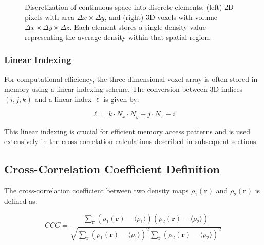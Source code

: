 \documentclass[12pt,a4paper]{article}
\begin{document}
\begin{figure}[h]
\caption{Discretization of continuous space into discrete 
elements: (left) 2D pixels with area $\Delta x \times \Delta y$, 
and (right) 3D voxels with volume $\Delta x \times \Delta y \times \Delta z$. 
Each element stores a single density value representing the average 
density within that spatial region.}
\label{fig:pixel_voxel}
\end{figure}

\subsubsection{Linear Indexing}

For computational efficiency, the three-dimensional voxel array 
is often stored in memory using a linear indexing scheme. The 
conversion between 3D indices $(i,j,k)$ and a linear index $\ell$ 
is given by:

\begin{equation}
\ell = k \cdot N_x \cdot N_y + j \cdot N_x + i
\end{equation}

This linear indexing is crucial for efficient memory access patterns 
and is used extensively in the cross-correlation calculations described 
in subsequent sections.
\subsection{Cross-Correlation Coefficient Definition}

The cross-correlation coefficient between two density maps 
$\rho_1(\mathbf{r})$ and $\rho_2(\mathbf{r})$ is defined as:

\begin{equation}
CCC = \frac{\sum_{\mathbf{r}} (\rho_1(\mathbf{r}) - \langle\rho_1\rangle)(\rho_2(\mathbf{r}) - \langle\rho_2\rangle)}{\sqrt{\sum_{\mathbf{r}} (\rho_1(\mathbf{r}) - \langle\rho_1\rangle)^2 \sum_{\mathbf{r}} (\rho_2(\mathbf{r}) - \langle\rho_2\rangle)^2}}
\end{equation}
\end{document}
